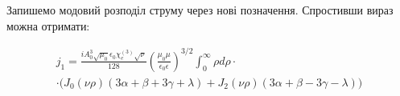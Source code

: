 Запишемо модовий розподіл струму через нові позначення. Спростивши вираз 
можна отримати:

%
%
%
\begin{equation} \begin{gathered}
j_1 = \frac{i A_0^3 \sqrt{\mu_0} \epsilon_0 \chi_e^{(3)} \sqrt{\nu}}{128}
\left( \frac{\mu_0 \mu}{\epsilon_0 \epsilon} \right)^{3/2}
\int_0^\infty \rho d \rho \cdot \\ \cdot
\Big( J_0 (\nu \rho) ( 3 \alpha + \beta + 3 \gamma + \lambda) + 
J_2 (\nu \rho) ( 3 \alpha + \beta - 3 \gamma - \lambda ) \Big)
\end{gathered} \end{equation}
%
